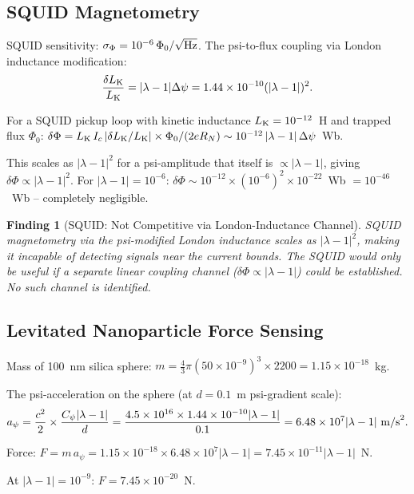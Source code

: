 \documentclass[11pt]{article}
\newtheorem{finding}{Finding}
\newcommand{\ee}[1]{\times 10^{#1}}
\begin{document}
\subsection{SQUID Magnetometry}

SQUID sensitivity: $\sigma_\Phi = 10^{-6}\,\Phi_0/\sqrt{\rm Hz}$.
The psi-to-flux coupling via London inductance modification:
\begin{equation}
\frac{\delta L_{\rm K}}{L_{\rm K}} = |\lambda-1|\Delta\psi = 1.44\ee{-10}(|\lambda-1|)^2.
\end{equation}

For a SQUID pickup loop with kinetic inductance $L_{\rm K} = 10^{-12}$~H
and trapped flux $\Phi_0$: $\delta\Phi = L_{\rm K}\,I_c\,|\delta L_{\rm K}/L_{\rm K}|
\times \Phi_0/(2eR_N) \sim 10^{-12}\,|\lambda-1|\,\Delta\psi$~Wb.

This scales as $|\lambda-1|^2$ for a psi-amplitude that itself is
$\propto |\lambda-1|$, giving $\delta\Phi \propto |\lambda-1|^2$.
For $|\lambda-1| = 10^{-6}$: $\delta\Phi \sim 10^{-12} \times (10^{-6})^2 \times 10^{-22}$~Wb
$= 10^{-46}$~Wb -- completely negligible.

\begin{finding}[SQUID: Not Competitive via London-Inductance Channel]
SQUID magnetometry via the psi-modified London inductance scales as $|\lambda-1|^2$,
making it incapable of detecting signals near the current bounds. The SQUID
would only be useful if a separate linear coupling channel ($\delta\Phi \propto |\lambda-1|$)
could be established. No such channel is identified.
\end{finding}

\subsection{Levitated Nanoparticle Force Sensing}

Mass of 100~nm silica sphere: $m = \frac{4}{3}\pi(50\ee{-9})^3 \times 2200
= 1.15\ee{-18}$~kg.

The psi-acceleration on the sphere (at $d = 0.1$~m psi-gradient scale):
\begin{equation}
a_\psi = \frac{c^2}{2} \times \frac{C_\psi|\lambda-1|}{d}
= \frac{4.5\ee{16}\times 1.44\ee{-10}|\lambda-1|}{0.1}
= 6.48\ee{7}|\lambda-1|~{\rm m/s}^2.
\end{equation}

Force: $F = m\,a_\psi = 1.15\ee{-18} \times 6.48\ee{7}|\lambda-1|
= 7.45\ee{-11}|\lambda-1|$~N.

At $|\lambda-1| = 10^{-9}$: $F = 7.45\ee{-20}$~N.
\end{document}
